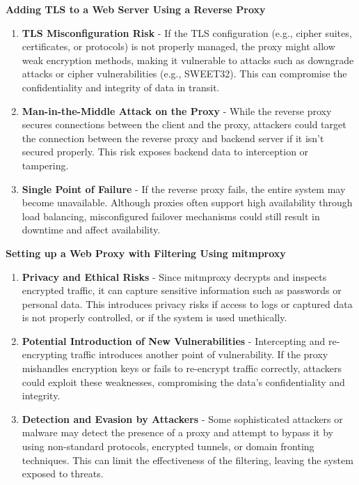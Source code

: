\documentclass[12pt,a4paper]{report}
\begin{document}
\textbf{Adding TLS to a Web Server Using a Reverse Proxy}
\begin{enumerate}
	\item \textbf{TLS Misconfiguration Risk} - If the TLS configuration (e.g., cipher suites, certificates, or protocols) is not properly managed, the proxy might allow weak encryption methods, making it vulnerable to attacks such as downgrade attacks or cipher vulnerabilities (e.g., SWEET32). This can compromise the confidentiality and integrity of data in transit.
	
	\item \textbf{Man-in-the-Middle Attack on the Proxy} - While the reverse proxy secures connections between the client and the proxy, attackers could target the connection between the reverse proxy and backend server if it isn't secured properly. This risk exposes backend data to interception or tampering.
	
	\item \textbf{Single Point of Failure} - If the reverse proxy fails, the entire system may become unavailable. Although proxies often support high availability through load balancing, misconfigured failover mechanisms could still result in downtime and affect availability.
\end{enumerate}

\textbf{Setting up a Web Proxy with Filtering Using mitmproxy}
\begin{enumerate}
	\item \textbf{Privacy and Ethical Risks} - Since mitmproxy decrypts and inspects encrypted traffic, it can capture sensitive information such as passwords or personal data. This introduces privacy risks if access to logs or captured data is not properly controlled, or if the system is used unethically.
	
	\item \textbf{Potential Introduction of New Vulnerabilities} - Intercepting and re-encrypting traffic introduces another point of vulnerability. If the proxy mishandles encryption keys or fails to re-encrypt traffic correctly, attackers could exploit these weaknesses, compromising the data’s confidentiality and integrity.
	
	\item \textbf{Detection and Evasion by Attackers} - Some sophisticated attackers or malware may detect the presence of a proxy and attempt to bypass it by using non-standard protocols, encrypted tunnels, or domain fronting techniques. This can limit the effectiveness of the filtering, leaving the system exposed to threats.
\end{enumerate}
\end{document}
